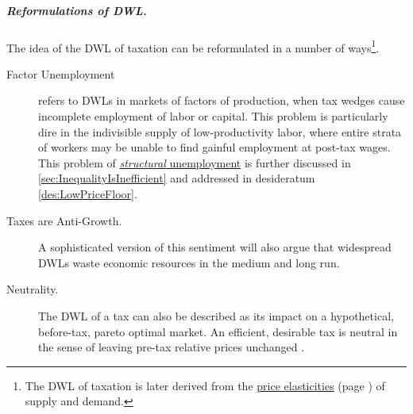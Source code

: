 \subparagraph{Reformulations of DWL.}
The idea of the DWL of taxation can be reformulated in a number of ways\footnote{The DWL of taxation is later derived from the \hyperref[sec:TaxInelastic]{price elasticities} (page \pageref{sec:TaxInelastic}) of supply and demand.}.
\begin{description}
	\item[Factor Unemployment]
	refers to DWLs in markets of factors of production, when tax wedges cause incomplete employment of labor or capital.
	This problem is particularly dire in the indivisible supply of low-productivity labor, where entire strata of workers may be unable to find gainful employment at post-tax wages.
	This problem of \hyperref[sec:StructuralUnemployment]{\emph{structural} unemployment} is further discussed in \autoref{sec:InequalityIsInefficient} and addressed in desideratum \ref{des:LowPriceFloor}.

	\item[Taxes are Anti-Growth.]
	A sophisticated version of this sentiment will also argue that widespread DWLs waste economic resources in the medium and long run.

	\item[Neutrality.]
	The DWL of a tax can also be described as its impact on a hypothetical, before-tax, pareto optimal market.
	An efficient, desirable tax is neutral in the sense of leaving pre-tax relative prices unchanged \citep[849]{McCaffery2005}.
\end{description}



